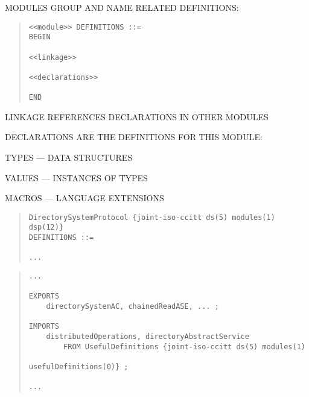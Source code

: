 \begin{bwslide}

\begin{nrtc}
\item	MODULES GROUP AND NAME RELATED DEFINITIONS:
\begin{quote}\small\begin{verbatim}
<<module>> DEFINITIONS ::=
BEGIN

<<linkage>>

<<declarations>>

END
\end{verbatim}\end{quote}
\item	LINKAGE REFERENCES DECLARATIONS IN OTHER MODULES
\item	DECLARATIONS ARE THE DEFINITIONS FOR THIS MODULE:
	\begin{nrtc}
	\item	TYPES --- DATA STRUCTURES
	\item	VALUES --- INSTANCES OF TYPES
	\item	MACROS --- LANGUAGE EXTENSIONS
	\end{nrtc}
\end{nrtc}
\end{bwslide}


\begin{bwslide}

\begin{quote}\small\begin{verbatim}
DirectorySystemProtocol {joint-iso-ccitt ds(5) modules(1) dsp(12)}
DEFINITIONS ::=

...
\end{verbatim}\end{quote}
\end{bwslide}

\begin{bwslide}

\begin{quote}\small\begin{verbatim}
...

EXPORTS
    directorySystemAC, chainedReadASE, ... ;

IMPORTS
    distributedOperations, directoryAbstractService
        FROM UsefulDefinitions {joint-iso-ccitt ds(5) modules(1) 
                                              usefulDefinitions(0)} ;

...
\end{verbatim}\end{quote}
\end{bwslide}


